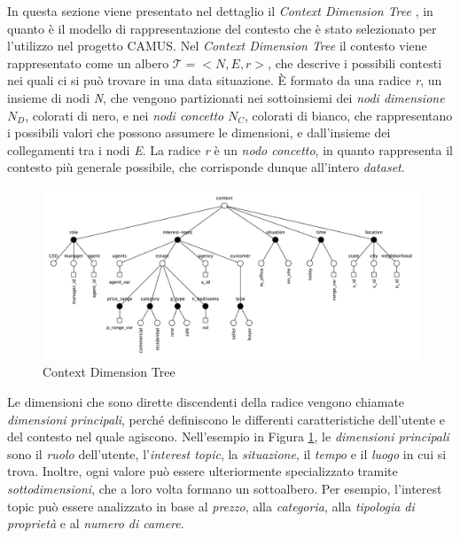 In questa sezione viene presentato nel dettaglio il \emph{Context Dimension Tree} \cite{DBLP:journals/is/BolchiniQT13}, in quanto è il modello di rappresentazione del contesto che è stato selezionato per l'utilizzo nel progetto CAMUS. Nel \emph{Context Dimension Tree} il contesto viene rappresentato come un albero $\mathcal{T} = {<}N, E, r{>} $, che descrive i possibili contesti nei quali ci si può trovare in una data situazione. \`E formato da una radice \emph{r}, un insieme di nodi \emph{N}, che vengono partizionati nei sottoinsiemi dei \emph{nodi dimensione} $N_D$, colorati di nero, e nei \emph{nodi concetto} $N_C$, colorati di bianco, che rappresentano i possibili valori che possono assumere le dimensioni, e dall'insieme dei collegamenti tra i nodi \emph{E}. La radice \emph{r} è un \emph{nodo concetto}, in quanto rappresenta il contesto più generale possibile, che corrisponde dunque all'intero \emph{dataset}.

\begin{figure}[ht]
	\centering
	\includegraphics[width=\textwidth]{2-preliminari/Immagini/esempio_cdt.pdf}
	\caption{Context Dimension Tree}\label{fig:context-dimension-tree}
\end{figure}

Le dimensioni che sono dirette discendenti della radice vengono chiamate \emph{dimensioni principali}, perché definiscono le differenti caratteristiche dell'utente e del contesto nel quale agiscono. Nell'esempio in Figura \ref{fig:context-dimension-tree}, le \emph{dimensioni principali} sono il \emph{ruolo} dell'utente, l'\emph{interest topic}, la \emph{situazione}, il \emph{tempo} e il \emph{luogo} in cui si trova. Inoltre, ogni valore può essere ulteriormente specializzato tramite \emph{sottodimensioni}, che a loro volta formano un sottoalbero. Per esempio, l'interest topic  può essere analizzato in base al \emph{prezzo}, alla \emph{categoria}, alla \emph{tipologia di proprietà} e al \emph{numero di camere}.

